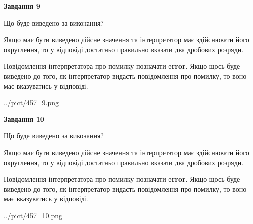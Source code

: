 \documentclass[12pt, ukrainian]{article}
\begin{document}
{\begin {Large}
{\begin {center}\textbf{Завдання 9}\end {center}}\par
Що буде виведено за виконання? \par

Якщо має бути виведено дійсне значення та інтерпретатор має здійснювати його округлення, 
то у відповіді достатньо правильно вказати два дробових розряди.

Повідомлення інтерпретатора про помилку позначати \textbf{error}.
Якщо щось буде виведено до того, як інтерпретатор видасть повідомлення про помилку, 
то воно має вказуватись у відповіді. \par

\begin{center}
	{../pict/457_9.png}
\end{center}
\newpage

{\begin {center}\textbf{Завдання 10}\end {center}}\par
Що буде виведено за виконання? \par

Якщо має бути виведено дійсне значення та інтерпретатор має здійснювати його округлення, 
то у відповіді достатньо правильно вказати два дробових розряди.

Повідомлення інтерпретатора про помилку позначати \textbf{error}.
Якщо щось буде виведено до того, як інтерпретатор видасть повідомлення про помилку, 
то воно має вказуватись у відповіді. \par

\begin{center}
	{../pict/457_10.png}
\end{center}
\newpage

\end {Large}}
\end{document}
